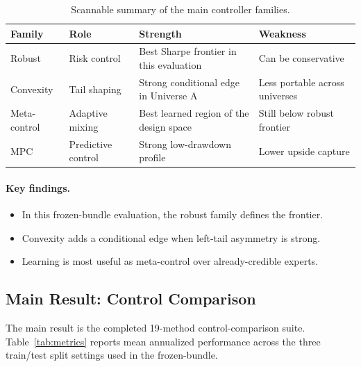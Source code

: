 \documentclass[10pt,twocolumn]{article}
\begin{document}
\begin{table}[t]
\centering
\footnotesize
\caption{Scannable summary of the main controller families.}
\label{tab:family_summary}
\begin{tabular}{@{} p{1.35cm} p{1.15cm} p{1.65cm} p{1.45cm} @{}}
\toprule
\textbf{Family} & \textbf{Role} & \textbf{Strength} & \textbf{Weakness} \\
\midrule
Robust & Risk control & Best Sharpe frontier in this evaluation & Can be conservative \\
Convexity & Tail shaping & Strong conditional edge in Universe A & Less portable across universes \\
Meta-control & Adaptive mixing & Best learned region of the design space & Still below robust frontier \\
MPC & Predictive control & Strong low-drawdown profile & Lower upside capture \\
\bottomrule
\end{tabular}
\end{table}

\paragraph{Key findings.}
\begin{itemize}[leftmargin=1.2em, itemsep=2pt, topsep=3pt]
\item In this frozen-bundle evaluation, the robust family defines the frontier.
\item Convexity adds a conditional edge when left-tail asymmetry is strong.
\item Learning is most useful as meta-control over already-credible experts.
\end{itemize}

\subsection{Main Result: Control Comparison}

The main result is the completed 19-method control-comparison suite.
Table~\ref{tab:metrics} reports mean annualized performance across the three
train/test split settings used in the frozen-bundle.
\end{document}
